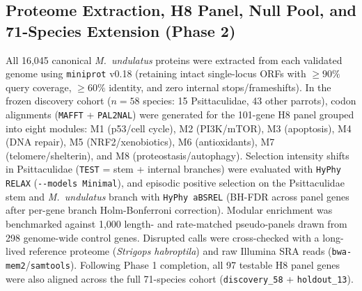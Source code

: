 \documentclass[10pt,a4paper,twocolumn]{article}
\begin{document}
\subsection{Proteome Extraction, H8 Panel, Null Pool, and 71-Species Extension (Phase 2)}
All 16,045 canonical \textit{M.\ undulatus} proteins were extracted from each validated genome using \texttt{miniprot} v0.18 (retaining intact single-locus ORFs with $\ge 90\%$ query coverage, $\ge 60\%$ identity, and zero internal stops/frameshifts). In the frozen discovery cohort ($n = 58$ species: 15 Psittaculidae, 43 other parrots), codon alignments (\texttt{MAFFT} + \texttt{PAL2NAL}) were generated for the 101-gene H8 panel grouped into eight modules: M1 (p53/cell cycle), M2 (PI3K/mTOR), M3 (apoptosis), M4 (DNA repair), M5 (NRF2/xenobiotics), M6 (antioxidants), M7 (telomere/shelterin), and M8 (proteostasis/autophagy). Selection intensity shifts in Psittaculidae (\texttt{TEST} = stem + internal branches) were evaluated with \texttt{HyPhy RELAX} (\texttt{-{}-models Minimal}), and episodic positive selection on the Psittaculidae stem and \textit{M.\ undulatus} branch with \texttt{HyPhy aBSREL} (BH-FDR across panel genes after per-gene branch Holm-Bonferroni correction). Modular enrichment was benchmarked against 1,000 length- and rate-matched pseudo-panels drawn from 298 genome-wide control genes. Disrupted calls were cross-checked with a long-lived reference proteome (\textit{Strigops habroptila}) and raw Illumina SRA reads (\texttt{bwa-mem2}/\texttt{samtools}). Following Phase 1 completion, all 97 testable H8 panel genes were also aligned across the full 71-species cohort (\texttt{discovery\_58} + \texttt{holdout\_13}).
\end{document}
